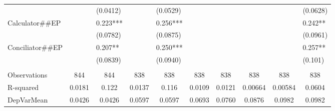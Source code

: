 \begin{tabular}{rrrrrrrrrr}
\multicolumn{1}{l}{} & \multicolumn{1}{l}{} & \multicolumn{1}{l}{(0.0412)} & \multicolumn{1}{l}{} & \multicolumn{1}{l}{(0.0529)} & \multicolumn{1}{l}{} & \multicolumn{1}{l}{} & \multicolumn{1}{l}{} & \multicolumn{1}{l}{} & \multicolumn{1}{l}{(0.0628)} \\
\multicolumn{1}{l}{Calculator\#\#EP} & \multicolumn{1}{l}{} & \multicolumn{1}{l}{0.223***} & \multicolumn{1}{l}{} & \multicolumn{1}{l}{0.256***} & \multicolumn{1}{l}{} & \multicolumn{1}{l}{} & \multicolumn{1}{l}{} & \multicolumn{1}{l}{} & \multicolumn{1}{l}{0.242**} \\
\multicolumn{1}{l}{} & \multicolumn{1}{l}{} & \multicolumn{1}{l}{(0.0782)} & \multicolumn{1}{l}{} & \multicolumn{1}{l}{(0.0875)} & \multicolumn{1}{l}{} & \multicolumn{1}{l}{} & \multicolumn{1}{l}{} & \multicolumn{1}{l}{} & \multicolumn{1}{l}{(0.0961)} \\
\multicolumn{1}{l}{Conciliator\#\#EP} & \multicolumn{1}{l}{} & \multicolumn{1}{l}{0.207**} & \multicolumn{1}{l}{} & \multicolumn{1}{l}{0.250***} & \multicolumn{1}{l}{} & \multicolumn{1}{l}{} & \multicolumn{1}{l}{} & \multicolumn{1}{l}{} & \multicolumn{1}{l}{0.257**} \\
\multicolumn{1}{l}{} & \multicolumn{1}{l}{} & \multicolumn{1}{l}{(0.0839)} & \multicolumn{1}{l}{} & \multicolumn{1}{l}{(0.0940)} & \multicolumn{1}{l}{} & \multicolumn{1}{l}{} & \multicolumn{1}{l}{} & \multicolumn{1}{l}{} & \multicolumn{1}{l}{(0.101)} \\
\multicolumn{1}{l}{} &       & \multicolumn{1}{l}{} &       & \multicolumn{1}{l}{} &       &       &       &       & \multicolumn{1}{l}{} \\
\midrule
\multicolumn{1}{l}{Observations} & \multicolumn{1}{c}{844} & \multicolumn{1}{c}{844} & \multicolumn{1}{c}{838} & \multicolumn{1}{c}{838} & \multicolumn{1}{c}{838} & \multicolumn{1}{c}{838} & \multicolumn{1}{c}{838} & \multicolumn{1}{c}{838} & \multicolumn{1}{c}{838} \\
\multicolumn{1}{l}{R-squared} & \multicolumn{1}{c}{0.0181} & \multicolumn{1}{c}{0.122} & \multicolumn{1}{c}{0.0137} & \multicolumn{1}{c}{0.116} & \multicolumn{1}{c}{0.0109} & \multicolumn{1}{c}{0.0121} & \multicolumn{1}{c}{0.00664} & \multicolumn{1}{c}{0.00584} & \multicolumn{1}{c}{0.0604} \\
\multicolumn{1}{l}{DepVarMean} & \multicolumn{1}{c}{0.0426} & \multicolumn{1}{c}{0.0426} & \multicolumn{1}{c}{0.0597} & \multicolumn{1}{c}{0.0597} & \multicolumn{1}{c}{0.0693} & \multicolumn{1}{c}{0.0760} & \multicolumn{1}{c}{0.0876} & \multicolumn{1}{c}{0.0982} & \multicolumn{1}{c}{0.0982} \\

\end{tabular}
